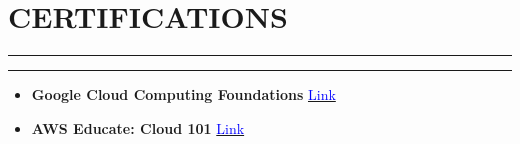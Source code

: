 \documentclass[a4paper]{article}
\newcommand{\sectionline}{
  \vspace{-2em} %
  \noindent\rule{\textwidth}{0.4pt}
  \vspace{0em} %
}
\newcommand{\verticalInd}{
  \vspace{-0.9em} %
  \noindent\rule{\textwidth}{0pt}
  \vspace{0em} %
}
\begin{document}
\vspace{-0.75em}

\section*{CERTIFICATIONS}
\sectionline
\verticalInd
\vspace{-2em}
\begin{itemize}[leftmargin=*]
    \item \textbf{Google Cloud Computing Foundations} \hfill \href{https://www.credly.com/badges/bffe6264-46ba-47cc-ba7b-d819015e2081/public_url}{\textcolor{blue}{Link}} 
    \vspace{-0.5em}
    \item \textbf{AWS Educate: Cloud 101} \hfill \href{https://www.credly.com/badges/bffe6264-46ba-47cc-ba7b-d819015e2081/public_url}{\textcolor{blue}{Link}} 
    \vspace{-0.5em}
\end{itemize}
\end{document}
